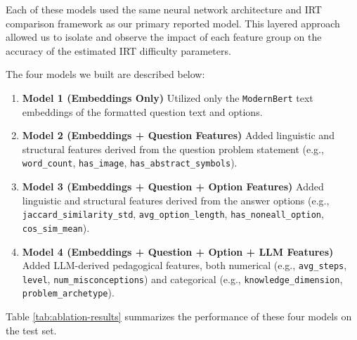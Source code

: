 \documentclass[
    a4paper, %
    10pt, %
    twoside, %
]{LTJournalArticle}
\begin{document}
Each of these models used the same neural network architecture and IRT comparison framework as our primary reported model. This layered approach allowed us to isolate and observe the impact of each feature group on the accuracy of the estimated IRT difficulty parameters.

The four models we built are described below:

\begin{enumerate}
    \item \textbf{Model 1 (Embeddings Only)}
    Utilized only the \texttt{ModernBert} text embeddings of the formatted question text and options.
    \item \textbf{Model 2 (Embeddings + Question Features)}
    Added linguistic and structural features derived from the question problem statement (e.g., \texttt{word\_count}, \texttt{has\_image}, \texttt{has\_abstract\_symbols}).
    \item \textbf{Model 3 (Embeddings + Question + Option Features)}
    Added linguistic and structural features derived from the answer options (e.g., \texttt{jaccard\_similarity\_std}, \texttt{avg\_option\_length}, \texttt{has\_noneall\_option}, \texttt{cos\_sim\_mean}).
    \item \textbf{Model 4 (Embeddings + Question + Option + LLM Features)}
    Added LLM-derived pedagogical features, both numerical (e.g., \texttt{avg\_steps}, \texttt{level}, \texttt{num\_misconceptions}) and categorical (e.g., \texttt{knowledge\_dimension}, \texttt{problem\_archetype}).
\end{enumerate}

Table \ref{tab:ablation-results} summarizes the performance of these four models on the test set.

\begin{table}[H]
    \centering
    \caption{Feature ablation study results: difficulty correlation metrics.}
    \label{tab:ablation-results}
\end{table}
\end{document}
